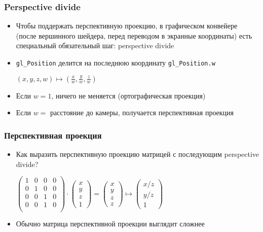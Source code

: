 \documentclass{beamer}
\begin{document}
\begin{frame}[fragile]
\frametitle{Perspective divide}
\begin{itemize}
\item Чтобы поддержать перспективную проекцию, в графическом конвейере (после вершинного шейдера, перед переводом в экранные координаты) есть специальный обязательный шаг: perspective divide
\pause
\item \verb|gl_Position| делится на последнюю координату \verb|gl_Position.w|
\begin{center}
\begin{math}
(x, y, z, w) \mapsto \left(\frac{x}{w}, \frac{y}{w}, \frac{z}{w}\right)
\end{math}
\end{center}
\pause
\item Если \begin{math}w=1\end{math}, ничего не меняется (ортографическая проекция)
\pause
\item Если \begin{math}w=\end{math} расстояние до камеры, получается перспективная проекция
\end{itemize}
\end{frame}

\begin{frame}[fragile]
\frametitle{Перспективная проекция}
\begin{itemize}
\item Как выразить перспективную проекцию матрицей с последующим perspective divide?
\pause
\begin{center}
\begin{math}
\begin{pmatrix}
1 & 0 & 0 & 0 \\
0 & 1 & 0 & 0 \\
0 & 0 & 1 & 0 \\
0 & 0 & 1 & 0 \\
\end{pmatrix}
\cdot
\begin{pmatrix}
x \\ y \\ z \\ 1
\end{pmatrix}
=
\begin{pmatrix}
x \\ y \\ z \\ z
\end{pmatrix}
\mapsto
\begin{pmatrix}
x/z \\ y/z \\ 1
\end{pmatrix}
\end{math}
\end{center}
\pause
\item Обычно матрица перспективной проекции выглядит сложнее
\end{itemize}
\end{frame}
\end{document}
